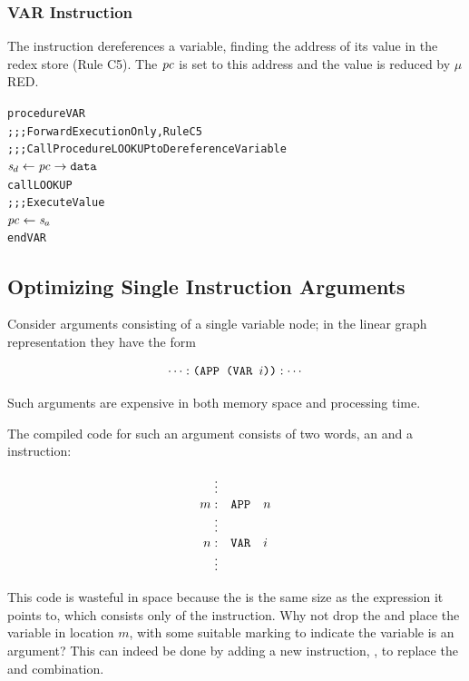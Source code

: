 \subsubsection*{VAR Instruction}

The  instruction dereferences a variable, finding the address of its value in the redex store (Rule C5). The \(\mathit{pc}\) is set to this address and the value is reduced by \(\mu\)RED.


\par\smallskip\noindent\begin{minipage}{\linewidth}
\begin{alltt}
procedure VAR
  \textrm{;;; Forward Execution Only, Rule C5}
  \textrm{;;; Call Procedure LOOKUP to Dereference Variable}
  \(\rtsd \leftarrow \rtfield{pc}{data}\)
  call LOOKUP
  \textrm{;;; Execute Value}
  \(\rt{pc} \leftarrow \rtsa\)
end VAR
\end{alltt}
\end{minipage}\par\smallskip


\subsection{Optimizing Single Instruction Arguments}

Consider arguments consisting of a single variable node; in the linear graph representation
they have the form

\[
\cdots:\texttt{(APP (VAR }i\texttt{))}:\cdots
\]

Such arguments are expensive in both memory space and processing time.

The compiled code for such an argument consists of two words, an  and a
 instruction:

\[
\begin{array}{rll}
\vdots\\
m: & \texttt{APP} & n\\
\vdots\\
n: & \texttt{VAR} & i\\
\vdots
\end{array}
\]

This code is wasteful in space because the  is the same size as the
expression it points to, which consists only of the  instruction. Why not
drop the  and place the variable in location \(m\), with some suitable
marking to indicate the variable is an argument? This can indeed be done by adding
a new instruction, , to replace the  and 
combination.

